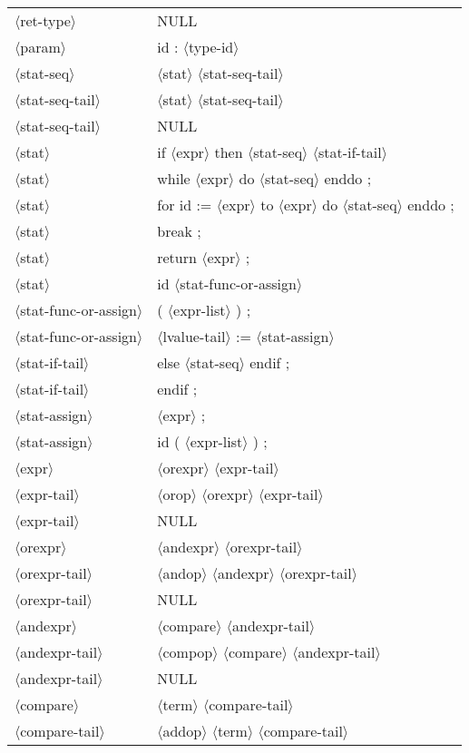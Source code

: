 \documentclass[11pt, fleqn]{article}
\newcommand{\atag}[1]{$\langle$#1$\rangle$}
\begin{document}
\begin{longtable}{l|l}
\atag{ret-type}					&	NULL		\\
\atag{param}						&	id : \atag{type-id}		\\
\atag{stat-seq}					&	\atag{stat} \atag{stat-seq-tail}		\\
\atag{stat-seq-tail}				&	\atag{stat} \atag{stat-seq-tail}		\\
\atag{stat-seq-tail}				&	NULL		\\
\atag{stat}						&	if \atag{expr} then \atag{stat-seq} \atag{stat-if-tail}		\\
\atag{stat}						&	while \atag{expr} do \atag{stat-seq} enddo ;		\\
\atag{stat}						&	for id := \atag{expr} to \atag{expr} do \atag{stat-seq} enddo ;		\\
\atag{stat}						&	break ;		\\
\atag{stat}						&	return \atag{expr} ;		\\
\atag{stat}						&	id \atag{stat-func-or-assign}	\\
\atag{stat-func-or-assign}		&	( \atag{expr-list} ) ;	\\
\atag{stat-func-or-assign}		&	\atag{lvalue-tail} := \atag{stat-assign}	\\
\atag{stat-if-tail}				&	else \atag{stat-seq} endif ;		\\
\atag{stat-if-tail}				&	endif ;		\\
\atag{stat-assign}				&	\atag{expr}	;	\\
\atag{stat-assign}				&	id ( \atag{expr-list} ) ;	\\
\atag{expr}						&	\atag{orexpr} \atag{expr-tail}		\\
\atag{expr-tail}					&	\atag{orop} \atag{orexpr} \atag{expr-tail}	\\
\atag{expr-tail}					&	NULL		\\
\atag{orexpr} 					&	\atag{andexpr} \atag{orexpr-tail}		\\
\atag{orexpr-tail}				&	\atag{andop} \atag{andexpr} \atag{orexpr-tail}	\\
\atag{orexpr-tail}				&	NULL	\\
\atag{andexpr} 					&	\atag{compare} \atag{andexpr-tail}		\\
\atag{andexpr-tail}				&	\atag{compop} \atag{compare} \atag{andexpr-tail}	\\
\atag{andexpr-tail}				&	NULL	\\
\atag{compare} 					&	\atag{term} \atag{compare-tail}		\\
\atag{compare-tail}				&	\atag{addop} \atag{term} \atag{compare-tail}	\\

\end{longtable}
\end{document}
